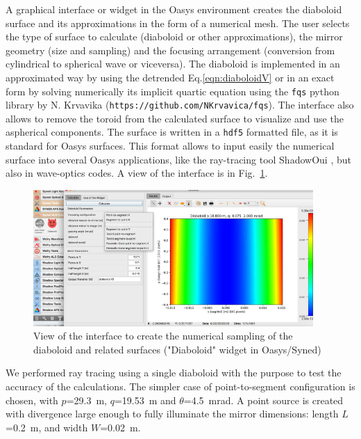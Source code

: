 \documentclass{iucr}              %
\begin{document}
A graphical interface or widget in the Oasys environment  creates the diaboloid surface and its approximations in the form of a numerical mesh. The user selects the type of surface to calculate (diaboloid or other approximations), the mirror geometry (size and sampling) and the focusing arrangement (conversion from cylindrical to spherical wave or viceversa). 
The diaboloid is implemented in an approximated way by using the detrended Eq.\ref{eqn:diaboloidV} or in an exact form by solving numerically its implicit quartic equation using the {\tt fqs} python library by N. Krvavika ({\tt https://github.com/NKrvavica/fqs}). 
The interface also allows to remove the toroid from the calculated surface to visualize and use the aspherical components. The surface is written in a {\tt hdf5} formatted file, as it is standard for Oasys surfaces. This format allows to input easily the numerical surface into several Oasys applications, like the ray-tracing tool ShadowOui \cite{codeSHADOWOUI}, but also in wave-optics codes. A view of the interface is in Fig.~\ref{fig:widget}.

\begin{figure}\label{fig:widget}
\centering
\includegraphics[width=0.95\textwidth]{figures/widget.png}
\caption{View of the interface to create the numerical sampling of the diaboloid and related surfaces ("Diaboloid" widget in Oasys/Syned) }
\end{figure}


We performed ray tracing using a single diaboloid with the purpose to test the accuracy of the calculations. The simpler case of point-to-segment configuration is chosen, with $p$=29.3~m, $q$=19.53~m and $\theta$=4.5~mrad. A point source is created with divergence large enough to fully illuminate the mirror dimensions: length $L$=0.2~m, and width $W$=0.02~m.
\end{document}
